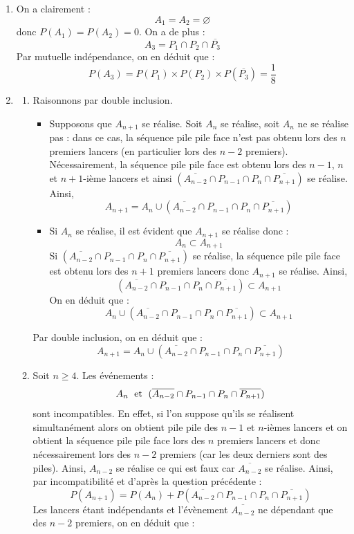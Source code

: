\documentclass[a4paper,10pt]{report}
\begin{document}
\begin{enumerate}
\item On a clairement :
$$ A_1=A_2= \varnothing$$
donc $P(A_1)=P(A_2)=0$. On a de plus :
$$ A_3 = P_1 \cap P_2 \cap \overline{P_3}$$
Par mutuelle indépendance, on en déduit que :
$$ P(A_3) = P(P_1) \times P(P_2) \times P(\overline{P_3}) = \dfrac{1}{8}$$
\item 
\begin{enumerate}
\item Raisonnons par double inclusion.
\begin{itemize}
\item Supposons que $A_{n+1}$ se réalise. Soit $A_n$ se réalise, soit $A_n$ ne se réalise pas : dans ce cas, la séquence pile pile face n'est pas obtenu lors des $n$ premiers lancers (en particulier lors des $n-2$ premiers). Nécessairement, la séquence pile pile face est obtenu lors des $n-1$, $n$ et $n+1$-ième lancers et ainsi $(\overline{A_{n-2}} \cap P_{n-1} \cap P_n \cap \overline{P_{n+1}})$ se réalise. Ainsi,
$$ A_{n+1} = A_n  \cup (\overline{A_{n-2}} \cap P_{n-1} \cap P_n \cap \overline{P_{n+1}})$$
\item Si $A_n$ se réalise, il est évident que $A_{n+1}$ se réalise donc :
$$ A_n \subset A_{n+1}$$
Si $(\overline{A_{n-2}} \cap P_{n-1} \cap P_n \cap \overline{P_{n+1}})$ se réalise, la séquence pile pile face est obtenu lors des $n+1$ premiers lancers donc $A_{n+1}$ se réalise. Ainsi,
$$ (\overline{A_{n-2}} \cap P_{n-1} \cap P_n \cap \overline{P_{n+1}}) \subset A_{n+1}$$
On en déduit que :
$$ A_n \cup (\overline{A_{n-2}} \cap P_{n-1} \cap P_n \cap \overline{P_{n+1}})\subset A_{n+1}$$
\end{itemize}
Par double inclusion, on en déduit que :
$$A_{n+1} = A_n  \cup (\overline{A_{n-2}} \cap P_{n-1} \cap P_n \cap \overline{P_{n+1}})$$
\item Soit $n \geq 4$. Les événements :
$$  A_n  \; \hbox{ et } \;  (\overline{A_{n-2}} \cap P_{n-1} \cap P_n \cap \overline{P_{n+1}})$$
sont incompatibles. En effet, si l'on suppose qu'ils se réalisent simultanément alors on obtient pile pile des $n-1$ et $n$-ièmes lancers et on obtient la séquence pile pile face lors des $n$ premiers lancers et donc nécessairement lors des $n-2$ premiers (car les deux derniers sont des piles). Ainsi, $A_{n-2}$ se réalise ce qui est faux car $\overline{A_{n-2}}$ se réalise. Ainsi, par incompatibilité et d'après la question précédente :
$$ P(A_{n+1}) = P(A_n) +   P(\overline{A_{n-2}} \cap P_{n-1} \cap P_n \cap \overline{P_{n+1}})$$
Les lancers étant indépendants et l'évènement $\overline{A_{n-2}}$ ne dépendant que des $n-2$ premiers, on en déduit que :

\end{enumerate}
\end{enumerate}
\end{document}
